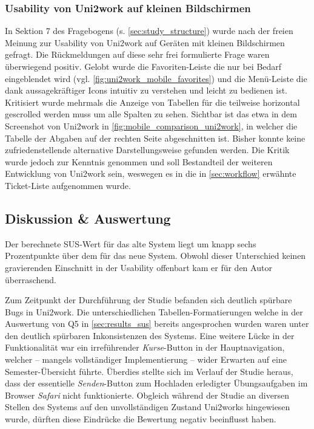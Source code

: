 \documentclass[11pt,a4paper,twoside,ngerman]{article}
\begin{document}
\subsubsection{Usability von Uni2work auf kleinen Bildschirmen}
In Sektion 7 des Fragebogens (s. \autoref{sec:study_structure}) wurde nach der freien Meinung zur Usability von Uni2work auf Geräten mit kleinen Bildschirmen gefragt. Die Rückmeldungen auf diese sehr frei formulierte Frage waren überwiegend positiv. Gelobt wurde die Favoriten-Leiste die nur bei Bedarf eingeblendet wird (vgl. \autoref{fig:uni2work_mobile_favorites}) und die Menü-Leiste die dank aussagekräftiger Icons intuitiv zu verstehen und leicht zu bedienen ist. Kritisiert wurde mehrmals die Anzeige von Tabellen für die teilweise horizontal gescrolled werden muss um alle Spalten zu sehen. Sichtbar ist das etwa in dem Screenshot von Uni2work in \autoref{fig:mobile_comparison_uni2work}, in welcher die Tabelle der Abgaben auf der rechten Seite abgeschnitten ist. Bisher konnte keine zufriedenstellende alternative Darstellungsweise gefunden werden. Die Kritik wurde jedoch zur Kenntnis genommen und soll Bestandteil der weiteren Entwicklung von Uni2work sein, weswegen es in die in \autoref{sec:workflow} erwähnte Ticket-Liste aufgenommen wurde.

\subsection{Diskussion \& Auswertung} \label{sec:results_discussion}
Der berechnete SUS-Wert für das alte System liegt um knapp sechs Prozentpunkte über dem für das neue System. Obwohl dieser Unterschied keinen gravierenden Einschnitt in der Usability offenbart kam er für den Autor überraschend.

Zum Zeitpunkt der Durchführung der Studie befanden sich deutlich spürbare Bugs in Uni2work. Die unterschiedlichen Tabellen-Formatierungen welche in der Auswertung von Q5 in \autoref{sec:results_sus} bereits angesprochen wurden waren unter den deutlich spürbaren Inkonsistenzen des Systems. Eine weitere Lücke in der Funktionalität war ein irreführender \textit{Kurse}-Button in der Hauptnavigation, welcher -- mangels vollständiger Implementierung -- wider Erwarten auf eine Semester-Übersicht führte. Überdies stellte sich im Verlauf der Studie heraus, dass der essentielle \textit{Senden}-Button zum Hochladen erledigter Übungsaufgaben im Browser \textit{Safari} nicht funktionierte. Obgleich während der Studie an diversen Stellen des Systems auf den unvollständigen Zustand Uni2works hingewiesen wurde, dürften diese Eindrücke die Bewertung negativ beeinflusst haben.
\end{document}
